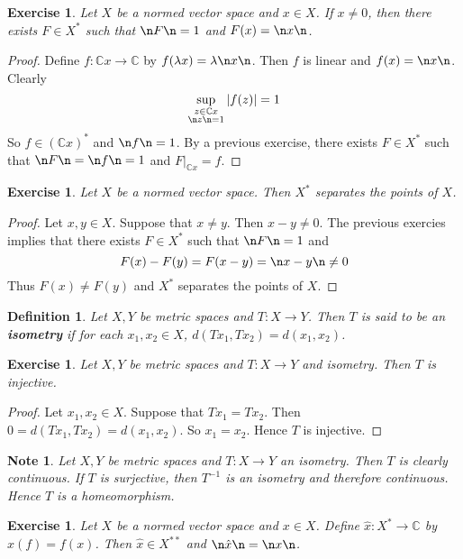 \documentclass[12pt]{amsart}
\newtheorem{defn}[thm]{Definition}
\newtheorem{note}[thm]{Note}
\newtheorem{ex}[thm]{Exercise}
\newcommand{\lam}{\lambda}
\newcommand{\C}{\mathbb{C}}
\begin{document}
\begin{ex}
	Let $X$ be a normed vector space and $x \in X$. If $x \neq 0$, then there exists $F \in X^*$ such that $\n F \n = 1$ and $F(x) = \n x \n$.
\end{ex}

\begin{proof}
	Define $f:\C x \rightarrow \C$ by $f(\lam x) = \lam \n x \n$. Then $f$ is linear and $f(x) = \n x \n$. Clearly $$\sup_{\substack{z \in \C x \\ \n z \n =1}}\vert f(z) \vert = 1$$ 
	So $f \in (\C x)^*$ and $\n f \n = 1$. By a previous exercise, there exists $F \in X^*$ such that $\n F \n = \n f \n =1$ and $F|_{\C x} = f$. 
\end{proof}

\begin{ex}
	Let $X$ be a normed vector space. Then $X^*$ separates the points of $X$. 
\end{ex}

\begin{proof}
	Let $x, y \in X$. Suppose that $x \neq y$. Then $x-y \neq 0$. The previous exercies implies that there exists $F \in X^*$ such that $\n F \n = 1$ and $$F(x) - F(y) = F(x-y) = \n x-y \n \neq 0$$ Thus $F(x) \neq F(y)$ and $X^*$ separates the points of $X$.
\end{proof}

\begin{defn}
	Let $X, Y$ be metric spaces and $T : X \rightarrow Y$. Then $T$ is said to be an \textbf{isometry} if for each $x_1, x_2 \in X$, $d( Tx_1, Tx_2) = d(x_1,x_2) $.
\end{defn}

\begin{ex}
	Let $X,Y$ be metric spaces and $T:X \rightarrow Y$ and isometry. Then $T$ is injective.
\end{ex}

\begin{proof}
	Let $x_1, x_2 \in X$. Suppose that $Tx_1=Tx_2$. Then $0= d( Tx_1, Tx_2) = d(x_1,x_2)$. So $x_1 = x_2$. Hence $T$ is injective.
\end{proof}

\begin{note}
	Let $X,Y$ be metric spaces and $T:X \rightarrow Y$ an isometry. Then $T$ is clearly continuous. If $T$ is surjective, then $T^{-1}$ is an isometry and therefore continuous. Hence $T$ is a homeomorphism.
\end{note}

\begin{ex}
	Let $X$ be a normed vector space and $x \in X$. Define $\hat{x}:X^* \rightarrow \C$ by $\hat{x}(f) = f(x)$. Then $\hat{x} \in X^{**}$ and $\n \hat{x} \n = \n x \n$.
\end{ex}
\end{document}
